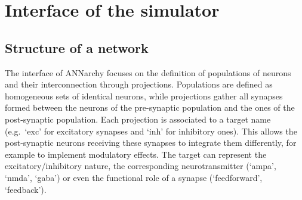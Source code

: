 \documentclass[
  11pt,
  a4paper,
]{scrbook}
\begin{document}
\section{Interface of the simulator}\label{interface-of-the-simulator}

\subsection{Structure of a network}\label{structure-of-a-network}

The interface of ANNarchy focuses on the definition of populations of
neurons and their interconnection through projections. Populations are
defined as homogeneous sets of identical neurons, while projections
gather all synapses formed between the neurons of the pre-synaptic
population and the ones of the post-synaptic population. Each projection
is associated to a target name (e.g.~`exc' for excitatory synapses and
`inh' for inhibitory ones). This allows the post-synaptic neurons
receiving these synapses to integrate them differently, for example to
implement modulatory effects. The target can represent the
excitatory/inhibitory nature, the corresponding neurotransmitter
(`ampa', `nmda', `gaba') or even the functional role of a synapse
(`feedforward', `feedback').
\end{document}
